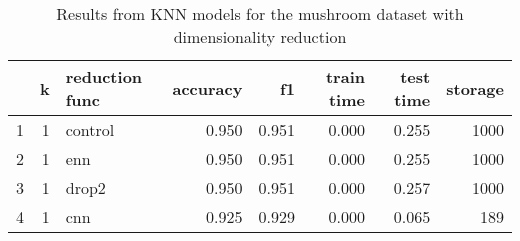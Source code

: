 \begin{table}
\centering
\caption{Results from KNN models for the mushroom dataset with dimensionality reduction}
\begin{tabular}{rrlrrrrr}
\toprule
 & k & reduction func & accuracy & f1 & train time & test time & storage \\
\midrule
1 & 1 & control & 0.950 & 0.951 & 0.000 & 0.255 & 1000 \\
2 & 1 & enn & 0.950 & 0.951 & 0.000 & 0.255 & 1000 \\
3 & 1 & drop2 & 0.950 & 0.951 & 0.000 & 0.257 & 1000 \\
4 & 1 & cnn & 0.925 & 0.929 & 0.000 & 0.065 & 189 \\
\bottomrule
\end{tabular}
\end{table}
